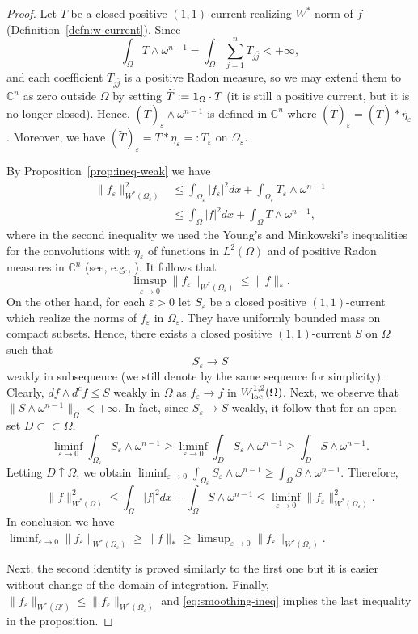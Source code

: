 \documentclass{amsart}
\newcommand{\wt}[1]{\widetilde{#1}}
\newcommand{\veps}{\varepsilon}
\newcommand{\om}{\omega}
\newcommand{\Om}{\Omega}
\newcommand{\bC}{\mathbb{C}}
\theoremstyle{definition}
\numberwithin{thm}{section}
\numberwithin{equation}{section}
\renewcommand{\[}{\begin{equation}}
\renewcommand{\]}{\end{equation}}
\newcommand{\wed}{\wedge}
\begin{document}
\begin{proof}
Let $T$ be a closed positive $(1,1)$-current realizing  $W^*$-norm of $f$ (Definition~\ref{defn:w-current}). Since 
$$
	\int_\Om T \wed\om^{n-1} = \int_\Om \sum_{j=1}^n T_{j\bar j} <+\infty,
$$
and each coefficient $T_{j \bar j}$  is a positive Radon measure, so we may extend them to $\bC^n$ as zero outside $\Om$ by setting $\wt T:= {\bf 1}_{\Om} \cdot T$ (it is still a positive current, but it is no longer closed). Hence, $(\wt T)_\veps\wed \om^{n-1}$ is defined in $\bC^n$ where $(\wt T)_\veps = (\wt T)*\eta_\veps$. Moreover, we have $(\wt T)_\veps = T*\eta_\veps =: T_\veps$ on $\Om_\veps$.

By Proposition~\ref{prop:ineq-weak} we have
\[\label{eq:smoothing-ineq}\begin{aligned}
	\|f_\veps\|_{W^*(\Om_\veps)}^2 
&\leq \int_{\Om_\veps} |f_\veps|^2 dx + \int_{\Om_\veps} T_\veps \wed \om^{n-1}\\
&\leq \int_\Om |f|^2 dx + \int_\Om T \wed \om^{n-1},
\end{aligned}\]
where in the second inequality we used the Young's and Minkowski's inequalities for the convolutions with $\eta_\veps$ of functions in $L^2(\Om)$ and of positive Radon measures in $\bC^n$ (see, e.g., \cite[Propositions~8.9, ~8.49]{Fd99}). It follows that $$\limsup_{\veps \to 0} \|f_\veps\|_{W^*(\Om_\veps)} \leq \|f\|_*.$$ 
On the other hand, for each $\veps>0$ let $S_\veps$ be a closed positive $(1,1)$-current which realize the norms of $f_\veps$ in $\Om_\veps$. They have uniformly bounded mass on compact subsets. Hence,  
there exists a closed positive $(1,1)$-current $S$ on $\Om$ such that
$$
	S_\veps \to S  
$$ 
weakly in subsequence (we still denote by the same sequence for simplicity).  Clearly, $df \wed d^c f \leq S$ weakly in $\Om$ as $f_\veps \to f$ in $W^{1,2}_{\rm loc}(\Om)$. 
Next, we observe that $\|S\wed \om^{n-1}\|_{\Om} <+\infty$. 
In fact, since $S_\veps \to S$ weakly, it follow that for an open set $D\subset\subset \Om$, 
$$
 \liminf_{\veps\to 0} \int_{\Om_\veps} S_\veps \wed \om^{n-1} \geq \liminf_{\veps \to 0}	\int_{D} S_\veps \wed \om^{n-1}\geq \int_{D} S \wed \om^{n-1}.
$$
Letting $D \uparrow \Om$, we obtain
$
	\liminf_{\veps \to 0} \int_{\Om_\veps} S_\veps \wed \om^{n-1}  \geq \int_\Om S\wed \om^{n-1}.
$
Therefore,
$$
	\|f\|_{W^*(\Om)}^2 \leq \int_\Om |f|^2 dx + \int_\Om S\wed \om^{n-1} \leq \liminf_{\veps\to 0} \|f_\veps\|^2_{W^*(\Om_\veps)}.
$$
In conclusion we have $\liminf_{\veps \to 0} \|f_\veps\|_{W^*(\Om_\veps)} \geq \|f\|_* \geq \limsup_{\veps \to 0} \|f_\veps\|_{W^*(\Om_\veps)}$. 

Next, the second identity is proved similarly to the first one but it is easier without change of the domain of integration. Finally, $\|f_\veps\|_{W^*(\Om')} \leq \|f_\veps\|_{W^*(\Om_\veps)}$ and  \eqref{eq:smoothing-ineq} implies the last inequality in the proposition.
\end{proof}
\end{document}
